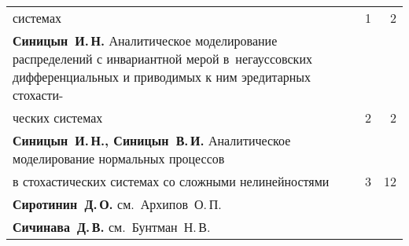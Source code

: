 {\begin{tabular}{p{388pt}rr}
\hspace*{23pt}системах\dotfill&1&2\\
\hangindent=23pt\noindent\textbf{Синицын~И.\,Н.} Аналитическое моделирование распределений с инвариантной
мерой в~негауссовских дифференциальных и приводимых к ним эредитарных
стохасти-\linebreak
\vspace*{-12pt}\\
\hspace*{23pt}ческих системах\dotfill&2&2\\
\textbf{Синицын~И.\,Н., Синицын~В.\,И.} Аналитическое моделирование нормальных
процессов\linebreak
\vspace*{-12pt}\\
\hspace*{23pt}в стохастических системах со сложными нелинейностями\dotfill&3&12\\
\textbf{Сиротинин~Д.\,О.} см.\ Архипов~О.\,П.&&\\
\textbf{Сичинава~Д.\,В.} см.\ Бунтман~Н.\,В.&&\\
\end{tabular}
}

\pagebreak

\def\leftkol{АВТОРСКИЙ УКАЗАТЕЛЬ ЗА 2014 г.} %

\def\rightkol{АВТОРСКИЙ УКАЗАТЕЛЬ ЗА 2014 г.} %

\def\leftfootline{\small{\textbf{\thepage}
\hfill ИНФОРМАТИКА И ЕЁ ПРИМЕНЕНИЯ\ \ \ том~8\ \ \ выпуск~4\ \ \ 2014}
}%
 \def\rightfootline{\small{ИНФОРМАТИКА И ЕЁ ПРИМЕНЕНИЯ\ \ \ том~8\ \ \ выпуск~4\ \ \ 2014
 \hfill \textbf{\thepage}}}


